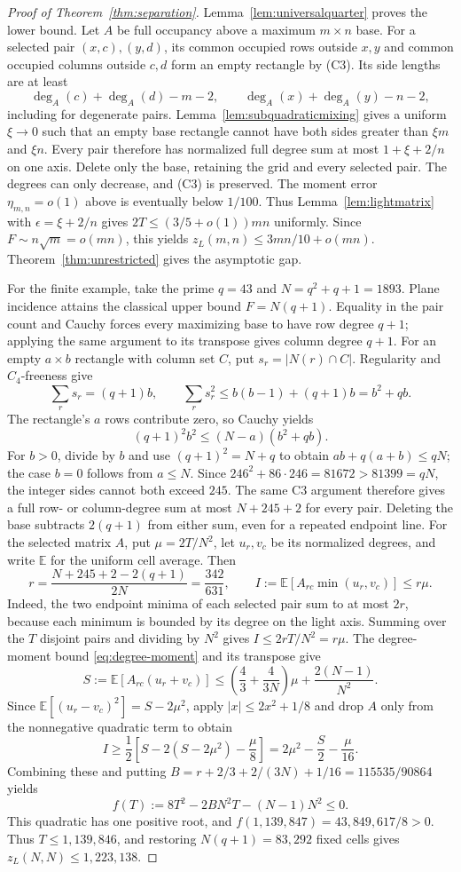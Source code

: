 \documentclass[11pt]{article}
\newcommand{\zl}{z_L}
\begin{document}
\begin{proof}[Proof of Theorem~\ref{thm:separation}]
Lemma~\ref{lem:universalquarter} proves the lower bound.
Let $A$ be full occupancy above a maximum $m\times n$ base.
For a selected pair $(x,c),(y,d)$, its common occupied rows outside
$x,y$ and common occupied columns outside $c,d$ form an empty rectangle
by (C3). Its side lengths are at least
\[
 \deg_A(c)+\deg_A(d)-m-2,\qquad
 \deg_A(x)+\deg_A(y)-n-2,
\]
including for degenerate pairs.
Lemma~\ref{lem:subquadraticmixing} gives a uniform $\xi\to0$ such
that an empty base rectangle cannot have both sides greater than
$\xi m$ and $\xi n$. Every pair therefore has normalized full degree
sum at most $1+\xi+2/n$ on one axis.
Delete only the base, retaining the grid and every selected pair.
The degrees can only decrease, and (C3) is preserved. The moment error
$\eta_{m,n}=o(1)$ above is eventually below $1/100$. Thus
Lemma~\ref{lem:lightmatrix} with $\epsilon=\xi+2/n$ gives $2T\le(3/5+o(1))mn$ uniformly.
Since $F\sim n\sqrt m=o(mn)$, this yields
$\zl(m,n)\le3mn/10+o(mn)$. Theorem~\ref{thm:unrestricted}
gives the asymptotic gap.

For the finite example, take the prime $q=43$ and $N=q^2+q+1=1893$.
Plane incidence attains the classical upper bound $F=N(q+1)$.
Equality in the pair count and Cauchy forces every maximizing base to
have row degree $q+1$; applying the same argument to its transpose
gives column degree $q+1$.
For an empty $a\times b$ rectangle with column set $C$, put
$s_r=|N(r)\cap C|$. Regularity and $C_4$-freeness give
\[
 \sum_r s_r=(q+1)b,\qquad
 \sum_r s_r^2\le b(b-1)+(q+1)b=b^2+qb.
\]
The rectangle's $a$ rows contribute zero, so Cauchy yields
\[
 (q+1)^2b^2\le(N-a)(b^2+qb).
\]
For $b>0$, divide by $b$ and use $(q+1)^2=N+q$ to obtain
$ab+q(a+b)\le qN$; the case $b=0$ follows from $a\le N$.
Since
$246^2+86\cdot246=81672>81399=qN$, the integer sides cannot
both exceed $245$. The same C3 argument therefore gives a full row-
or column-degree sum at most $N+245+2$ for every pair.
Deleting the base subtracts $2(q+1)$ from either sum, even for a repeated
endpoint line. For the selected matrix $A$, put $\mu=2T/N^2$, let $u_r,v_c$
be its normalized degrees, and write $\mathbb E$ for the uniform cell
average. Then
\[
 r=\frac{N+245+2-2(q+1)}{2N}=\frac{342}{631},
 \qquad I:=\mathbb E[A_{rc}\min(u_r,v_c)]\le r\mu.
\]
Indeed, the two endpoint minima of each selected pair sum to at most
$2r$, because each minimum is bounded by its degree on the light axis.
Summing over the $T$ disjoint pairs and dividing by $N^2$ gives
$I\le2rT/N^2=r\mu$.
The degree-moment bound \eqref{eq:degree-moment} and its transpose give
\[
 S:=\mathbb E[A_{rc}(u_r+v_c)]
 \le\left(\frac43+\frac4{3N}\right)\mu+\frac{2(N-1)}{N^2}.
\]
Since $\mathbb E[(u_r-v_c)^2]=S-2\mu^2$, apply
$|x|\le2x^2+1/8$ and drop $A$ only from the nonnegative quadratic term to obtain
\[
 I\ge\frac12\left[S-2(S-2\mu^2)-\frac\mu8\right]
    =2\mu^2-\frac S2-\frac\mu{16}.
\]
Combining these and putting
$B=r+2/3+2/(3N)+1/16=115535/90864$ yields
\[
 f(T):=8T^2-2BN^2T-(N-1)N^2\le0.
\]
This quadratic has one positive root, and
$f(1{,}139{,}847)=43{,}849{,}617/8>0$.
Thus $T\le1{,}139{,}846$, and restoring $N(q+1)=83{,}292$
fixed cells gives $\zl(N,N)\le1{,}223{,}138$.


\end{proof}
\end{document}
